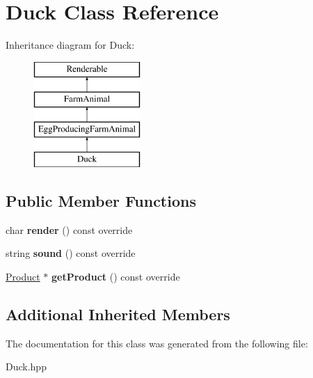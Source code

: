 \hypertarget{class_duck}{}\section{Duck Class Reference}
\label{class_duck}
Inheritance diagram for Duck\+:\begin{figure}[H]
\begin{center}
\leavevmode
\includegraphics[height=4.000000cm]{class_duck}
\end{center}
\end{figure}
\subsection*{Public Member Functions}
\begin{DoxyCompactItemize}
\item 
\mbox{\label{class_duck_affb64b601190dc21ea5fb068e3930f78}} 
char {\bfseries render} () const override
\item 
\mbox{\label{class_duck_a9f8f43e6ede727028e4251226710e411}} 
string {\bfseries sound} () const override
\item 
\mbox{\label{class_duck_a46590448b53940ba9cceace60647682c}} 
\mbox{\hyperlink{class_product}{Product}} $\ast$ {\bfseries get\+Product} () const override
\end{DoxyCompactItemize}
\subsection*{Additional Inherited Members}


The documentation for this class was generated from the following file\+:\begin{DoxyCompactItemize}
\item 
Duck.\+hpp\end{DoxyCompactItemize}
